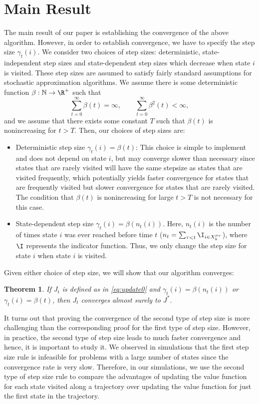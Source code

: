 \documentclass[12pt]{article}
\newtheorem{theorem}{Theorem}
\begin{document}
\section{Main Result}
The main result of our paper is establishing the convergence of the above algorithm. However, in order to establish convergence, we have to specify the step size $\gamma_t(i).$ We consider two choices of step sizes: deterministic, state-independent step sizes and state-dependent step sizes which decrease when state $i$ is visited. These step sizes are assumed to satisfy fairly standard assumptions for stochastic approximation algorithms. We assume there is some deterministic function $\beta: \mathbb{N} \to \R^+$ such that
\begin{equation*}
    \sum_{t=0}^\infty \beta(t) = \infty, \qquad \sum_{t=0}^\infty \beta^2(t) < \infty,
\end{equation*}
and we assume that there exists some constant $T$ such that $\beta(t)$ is nonincreasing for $t > T$. Then, our choices of step sizes are:
\begin{itemize}
    \item Deterministic step size $\gamma_t(i) = \beta(t)$: This choice is simple to implement and does not depend on state $i$, but may converge slower than necessary since states that are rarely visited will have the same stepsize as states that are visited frequently, which potentially yields faster convergence for states that are frequently visited but slower convergence for states that are rarely visited. The condition that $\beta(t)$ is nonincreasing for large $t>T$ is not necessary for this case.
    \item State-dependent step size $\gamma_t(i) = \beta(n_t(i))$. Here, $n_t(i)$ is the number of times state $i$ was ever reached before time $t$ ($n_t = \sum_{\tau < t} \I_{i \in X_k^{\mu_\tau}}$), where $\I$ represents the indicator function. Thus, we only change the step size for state $i$ when state $i$ is visited. 
\end{itemize} 

Given either choice of step size, we will show that our algorithm converges:

\begin{theorem}\label{main_theorem}
If $J_t$ is defined as in \eqref{eq:update0} and $\gamma_t(i) = \beta(n_t(i))$ or $\gamma_t(i) = \beta(t)$, then $J_t $ converges almost surely to $J^*$.
\end{theorem}

It turns out that proving the convergence of the second type of step size is more challenging than the corresponding proof for the first type of step size. However, in practice, the second type of step size leads to much faster convergence and hence, it is important to study it. We observed in simulations that the first step size rule is infeasible for problems with a large number of states since the convergence rate is very slow. Therefore, in our simulations, we use the second type of step size rule to compare the advantages of updating the value function for each state visited along a trajectory over updating the value function for just the first state in the trajectory.
\end{document}
